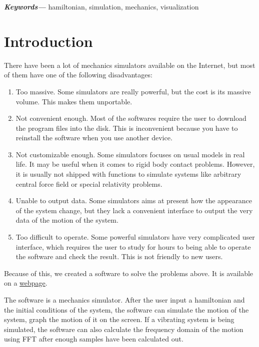 \documentclass[12pt]{article}
\providecommand{\keywords}[1]{\small\textbf{\textit{Keywords---}} #1}
\begin{document}
\keywords{hamiltonian, simulation, mechanics, visualization}

\tableofcontents

\section{Introduction}
\label{sec:intro}

There have been a lot of mechanics simulators available on the Internet,
but most of them have one of the following disadvantages:
\begin{enumerate}
  \item Too massive.
  Some simulators are really powerful, but the cost is its massive volume.
  This makes them unportable.

  \item Not convenient enough.
  Most of the softwares require the user to download the program files into the disk.
  This is inconvenient because you have to reinstall the software when you use another device.

  \item Not customizable enough.
  Some simulators focuses on usual models in real life.
  It may be useful when it comes to rigid body contact problems.
  However, it is usually not shipped with functions to simulate systems like arbitrary central force field or special relativity problems.

  \item Unable to output data.
  Some simulators aims at present how the appearance of the system change,
  but they lack a convenient interface to output the very data of the motion of the system.

  \item Too difficult to operate.
  Some powerful simulators have very complicated user interface,
  which requires the user to study for hours to being able to operate the software and check the result.
  This is not friendly to new users.
\end{enumerate}

Because of this, we created a software to solve the problems above.
It is available on a
\href{https://UlyssesZh.github.io/rpg/mechsimul2}{webpage}.

The software is a mechanics simulator.
After the user input a hamiltonian and the initial conditions of the system,
the software can simulate the motion of the system,
graph the motion of it on the screen.
If a vibrating system is being simulated,
the software can also calculate the frequency domain of the motion using FFT after enough samples have been calculated out.
\end{document}
